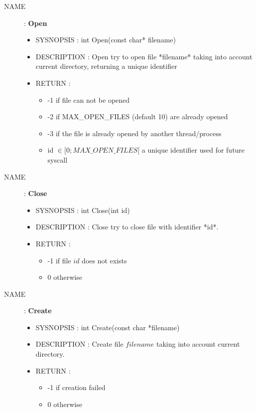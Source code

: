 \documentclass[a4paper,10pt]{article}
\begin{document}
\begin{description}
    \item [NAME] : \textbf{Open}
        \begin{itemize}
            \item SYSNOPSIS : int Open(const char* filename)
            \item DESCRIPTION :
                Open try to open file *filename* taking into account current directory,
                returning a unique identifier
            \item RETURN :
                \begin{itemize}
                    \item -1 if file can not be opened
                    \item -2 if MAX\_OPEN\_FILES (default 10) are already opened
                    \item -3 if the file is already opened by another thread/process
                    \item id $\in [0; MAX\_OPEN\_FILES[$ a unique identifier used for future syscall
                \end{itemize}
        \end{itemize}

    \item [NAME] : \textbf{Close}
        \begin{itemize}
            \item SYSNOPSIS : int Close(int id)
            \item DESCRIPTION :
                Close try to close file with identifier *id*.
            \item RETURN :
                \begin{itemize}
                    \item -1 if file $id$ does not exists
                    \item 0 otherwise
                \end{itemize}
        \end{itemize}

    \item [NAME] : \textbf{Create}
        \begin{itemize}
            \item SYSNOPSIS : int Create(const char *filename)
            \item DESCRIPTION :
                Create file $filename$ taking into account current directory.
            \item RETURN :
                \begin{itemize}
                    \item -1 if creation failed
                    \item 0 otherwise
                \end{itemize}
        \end{itemize}


\end{description}
\end{document}
